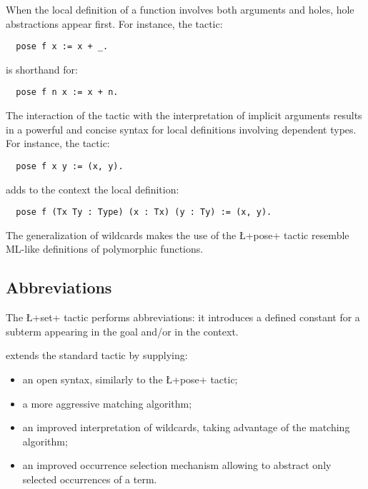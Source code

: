 When the local definition of a function involves both arguments and
holes, hole abstractions appear first. For instance, the
tactic:
\begin{lstlisting}
  pose f x := x + _.
\end{lstlisting}
is shorthand for:
\begin{lstlisting}
  pose f n x := x + n.
\end{lstlisting}


The interaction of the  tactic with the interpretation of
implicit arguments results in a powerful and concise syntax for local
definitions involving dependent types.
For instance, the tactic:
\begin{lstlisting}
  pose f x y := (x, y).
\end{lstlisting}
adds to the context the local definition:
\begin{lstlisting}
  pose f (Tx Ty : Type) (x : Tx) (y : Ty) := (x, y).
\end{lstlisting}
The generalization of wildcards makes the use of the \L+pose+ tactic
resemble ML-like definitions of polymorphic functions.




\subsection{Abbreviations}\label{ssec:set}


The \ssr{} \L+set+ tactic performs abbreviations: it introduces a
defined constant for a subterm appearing in the goal and/or in the
context.

\ssr{} extends the standard \Coq{}  tactic by supplying:
\begin{itemize}
\item an open syntax, similarly to the \L+pose+ tactic;
\item a more aggressive matching algorithm;
\item an improved interpretation of wildcards, taking advantage of the
  matching algorithm;
\item an improved occurrence selection mechanism allowing to abstract only
  selected occurrences of a term.
\end{itemize}

